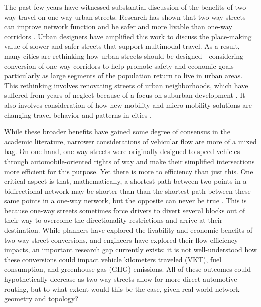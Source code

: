 \documentclass{trbunofficial}
\begin{document}
The past few years have witnessed substantial discussion of the benefits of two-way travel on one-way urban streets. Research has shown that two-way streets can improve network function \cite{gayah_two-way_2012,gayah_analytical_2012} and be safer and more livable than one-way corridors \cite{riggs_two-way_2015}. Urban designers have amplified this work to discuss the place-making value of slower and safer streets that support multimodal travel. As a result, many cities are rethinking how urban streets should be designed---considering conversion of one-way corridors to help promote safety and economic goals particularly as large segments of the population return to live in urban areas. This rethinking involves renovating streets of urban neighborhoods, which have suffered from years of neglect because of a focus on suburban development \cite{dover_street_2013,duany_suburban_2001}. It also involves consideration of how new mobility and micro-mobility solutions are changing travel behavior and patterns in cities \cite{clewlow_disruptive_2017,clewlow_micro-mobility_2018,riggs_disruptive_2019,shaheen_shared_2018}.

While these broader benefits have gained some degree of consensus in the academic literature, narrower considerations of vehicular flow are more of a mixed bag. On one hand, one-way streets were originally designed to speed vehicles through automobile-oriented rights of way and make their simplified intersections more efficient for this purpose. Yet there is more to efficiency than just this. One critical aspect is that, mathematically, a shortest-path between two points in a bidirectional network may be shorter than than the shortest-path between these same points in a one-way network, but the opposite can never be true \cite{ortigosa_analysis_2019}. This is because one-way streets sometimes force drivers to divert several blocks out of their way to overcome the directionality restrictions and arrive at their destination. While planners have explored the livability and economic benefits of two-way street conversions, and engineers have explored their flow-efficiency impacts, an important research gap currently exists: it is not well-understood how these conversions could impact vehicle kilometers traveled (VKT), fuel consumption, and greenhouse gas (GHG) emissions. All of these outcomes could hypothetically decrease as two-way streets allow for more direct automotive routing, but to what extent would this be the case, given real-world network geometry and topology?
\end{document}
